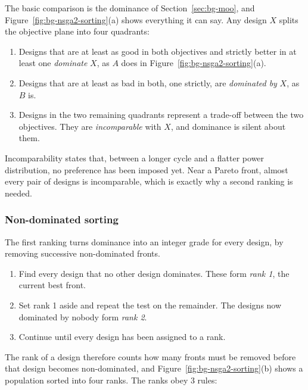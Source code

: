 The basic comparison is the dominance of Section~\ref{sec:bg-moo}, and
Figure~\ref{fig:bg-nsga2-sorting}(a) shows everything it can say. Any
design $X$ splits the objective plane into four quadrants:

\begin{enumerate}
  \item Designs that are at least as good in both objectives and
        strictly better in at least one \emph{dominate} $X$, as $A$ does
        in Figure~\ref{fig:bg-nsga2-sorting}(a).

  \item Designs that are at least as bad in both, one strictly, are
        \emph{dominated by} $X$, as $B$ is.

  \item Designs in the two remaining quadrants represent a trade-off between the two objectives. They are \emph{incomparable} with $X$, and
        dominance is silent about them.
\end{enumerate}

Incomparability states that, between a longer cycle and a flatter power
distribution, no preference has been imposed yet. Near a Pareto front,
almost every pair of designs is incomparable, which is exactly why a
second ranking is needed.

\subsubsection*{Non-dominated sorting}

The first ranking turns dominance into an integer grade for every
design, by removing successive non-dominated fronts.

\begin{enumerate}
  \item Find every design that no other design dominates. These form
        \emph{rank 1}, the current best front.

  \item Set rank 1 aside and repeat the test on the remainder. The
        designs now dominated by nobody form \emph{rank 2}.

  \item Continue until every design has been assigned to a rank.
\end{enumerate}

The rank of a design therefore counts how many fronts must be removed
before that design becomes non-dominated, and
Figure~\ref{fig:bg-nsga2-sorting}(b) shows a population sorted into
four ranks. The ranks obey 3 rules:

